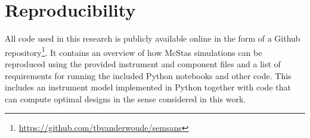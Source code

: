 \section{Reproducibility}
\label{c7.2}
All code used in this research is publicly available online in the form of a Github repository\footnote{\url{https://github.com/tbvanderwoude/semsans}}. It contains an overview of how McStas simulations can be reproduced using the provided instrument and component files and a list of requirements for running the included Python notebooks and other code. This includes an instrument model implemented in Python together with code that can compute optimal designs in the sense considered in this work.